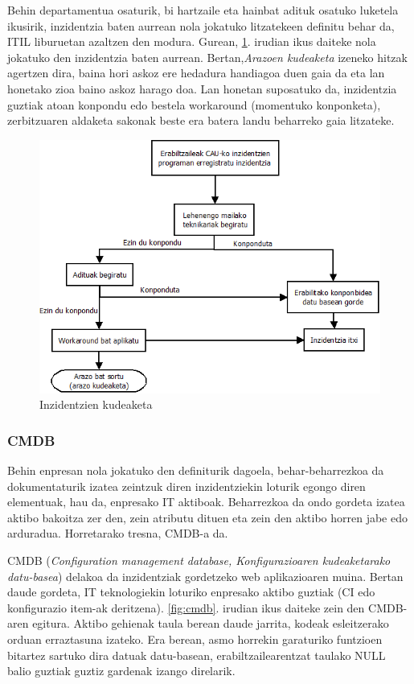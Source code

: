 Behin departamentua osaturik, bi hartzaile eta hainbat adituk osatuko luketela ikusirik, inzidentzia baten aurrean nola jokatuko litzatekeen definitu behar da, ITIL liburuetan azaltzen den modura. Gurean, \ref{fig:inzidentzia}. irudian ikus daiteke nola jokatuko den inzidentzia baten aurrean. Bertan,\textit{Arazoen kudeaketa} izeneko hitzak agertzen dira, baina hori askoz ere hedadura handiagoa duen gaia da eta lan honetako zioa baino askoz harago doa. Lan honetan suposatuko da, inzidentzia guztiak atoan konpondu edo bestela workaround (momentuko konponketa), zerbitzuaren aldaketa sakonak beste era batera landu beharreko gaia litzateke.

\begin{figure}
   \centering
   \includegraphics[scale=0.4]{irudiak/gestionInzidentzia.png}
   \caption{Inzidentzien kudeaketa}
   \label{fig:inzidentzia}
\end{figure}

\subsubsection{CMDB}
Behin enpresan nola jokatuko den definiturik dagoela, behar-beharrezkoa da dokumentaturik izatea zeintzuk diren inzidentziekin loturik egongo diren elementuak, hau da, enpresako IT aktiboak. Beharrezkoa da ondo gordeta izatea aktibo bakoitza zer den, zein atributu dituen eta zein den aktibo horren jabe edo arduradua. Horretarako tresna, CMDB-a da.

CMDB (\textit{Configuration management database, Konfigurazioaren kudeaketarako datu-basea}) delakoa da inzidentziak gordetzeko web aplikazioaren muina. Bertan daude gordeta, IT teknologiekin loturiko enpresako aktibo guztiak (CI edo konfigurazio item-ak deritzena). \ref{fig:cmdb}. irudian ikus daiteke zein den CMDB-aren egitura. Aktibo gehienak taula berean daude jarrita, kodeak esleitzerako orduan erraztasuna izateko. Era berean, asmo horrekin garaturiko funtzioen bitartez sartuko dira datuak datu-basean, erabiltzailearentzat taulako NULL balio guztiak guztiz gardenak izango direlarik.

